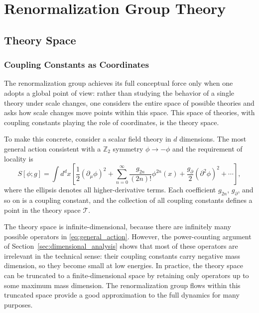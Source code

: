 \documentclass[11pt, twoside, openright]{book}
\theoremstyle{dotted}
\theoremstyle{definition}
\newcommand{\cT}{\mathcal{T}}          %
\begin{document}
\part{Renormalization Group Theory}

\chapter{Theory Space}
\label{ch:theory_space}

\section{Coupling Constants as Coordinates}

The renormalization group achieves its full conceptual force only when one adopts
a global point of view: rather than studying the behavior of a single theory under
scale changes, one considers the entire space of possible theories and asks how
scale changes move points within this space. This space of theories, with coupling
constants playing the role of coordinates, is the theory space.

To make this concrete, consider a scalar field theory in $d$ dimensions. The most
general action consistent with a $\mathbb{Z}_2$ symmetry $\phi \to -\phi$ and the
requirement of locality is
\begin{equation}
  S[\phi; g] = \int d^dx \left[
    \frac{1}{2}(\partial_\mu\phi)^2 + \sum_{n=0}^\infty
    \frac{g_{2n}}{(2n)!}\phi^{2n}(x)
    + \frac{g_\partial}{2}(\partial^2\phi)^2 + \cdots
  \right],
  \label{eq:general_action}
\end{equation}
where the ellipsis denotes all higher-derivative terms. Each coefficient $g_{2n}$,
$g_\partial$, and so on is a coupling constant, and the collection of all coupling
constants defines a point in the theory space $\cT$.

The theory space is infinite-dimensional, because there are infinitely many
possible operators in \eqref{eq:general_action}. However, the power-counting
argument of Section~\ref{sec:dimensional_analysis} shows that most of these operators
are irrelevant in the technical sense: their coupling constants carry negative mass
dimension, so they become small at low energies. In practice, the theory space can
be truncated to a finite-dimensional space by retaining only operators up to some
maximum mass dimension. The renormalization group flows within this truncated space
provide a good approximation to the full dynamics for many purposes.
\end{document}
